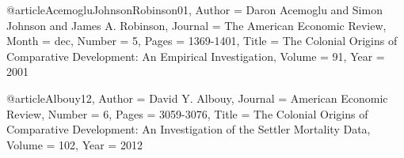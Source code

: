 @article{AcemogluJohnsonRobinson01,
	Author = {Daron Acemoglu and Simon Johnson and James A. Robinson},
	Journal = {The American Economic Review},
	Month = dec,
	Number = {5},
	Pages = {1369-1401},
	Title = {The Colonial Origins of Comparative Development: An Empirical Investigation},
	Volume = {91},
	Year = {2001}}

@article{Albouy12,
	Author = {David Y. Albouy},
	Journal = {American Economic Review},
	Number = {6},
	Pages = {3059-3076},
	Title = {The Colonial Origins of Comparative Development: An Investigation of the Settler Mortality Data},
	Volume = {102},
	Year = {2012}}